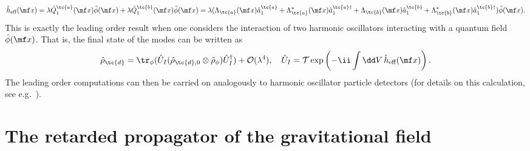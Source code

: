 {\begin{equation}
    \hat{h}_\text{eff}(\mf x) = \lambda \hat{Q}_1^{\tc{a}}(\mf x) \hat{\phi}(\mf x) +\lambda \hat{Q}_1^{\tc{b}}(\mf x) \hat{\phi}(\mf x)  = \lambda(\Lambda_\tc{a}(\mf x) \hat{a}^{\tc{a}}_1+\Lambda^*_\tc{a}(\mf x) \hat{a}^{\tc{a}\dagger}_1 + \Lambda_\tc{b}(\mf x) \hat{a}^{\tc{b}}_1+\Lambda^*_\tc{b}(\mf x) \hat{a}^{\tc{b}\dagger}_1)\hat{\phi}(\mf x).
\end{equation}
This is exactly the leading order result when one considers the interaction of two harmonic oscillators interacting with a quantum field $\hat{\phi}(\mf x)$. That is, the final state of the modes can be written as
\begin{equation}
    \hat{\rho}_\tc{d} = \tr_\phi(\hat{U}_I (\hat{\rho}_{\tc{d},0} \otimes \hat{\rho}_\phi )\hat{U}_I^\dagger) + \mathcal{O}(\lambda^4), \quad \hat{U}_I = \mathcal{T}\exp\left(-\ii \int \dd V \, \hat{h}_\text{eff}(\mf x)\right).
\end{equation}
The leading order computations can then be carried on analogously to harmonic oscillator particle detectors (for details on this calculation, see e.g.~\cite{EricksonZero}). 



\chapter{The retarded propagator of the gravitational field}\label{app:retGrav}


}
